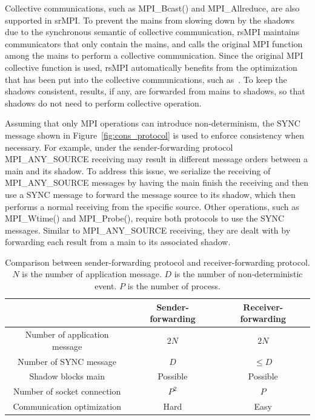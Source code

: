 Collective communications, such as MPI\_Bcast() and MPI\_Allreduce, are also supported in srMPI. To prevent the mains from slowing down by the shadows due to the synchronous semantic of collective communication, rsMPI maintains communicators that only contain the mains, and calls the original MPI function among the mains to perform a collective communication. Since the original MPI collective function is used, rsMPI automatically benefits from the optimization that has been put into the collective communications, such as~\cite{thakur2005optimization}. To keep the shadows consistent, results, if any, are forwarded from mains to shadows, so that shadows do not need to perform collective operation.

Assuming that only MPI operations can introduce non-determinism, the SYNC message shown in Figure~\ref{fig:cons_protocol} is used to enforce consistency when necessary. For example, under the sender-forwarding protocol MPI\_ANY\_SOURCE receiving may result in different message orders between a main and its shadow. To address this issue, we serialize the receiving of MPI\_ANY\_SOURCE messages by having the main finish the receiving and then use a SYNC message to forward the message source to its shadow, which then performs a normal receiving from the specific source. Other operations, such as MPI\_Wtime() and MPI\_Probe(), require both protocols to use the SYNC messages. Similar to MPI\_ANY\_SOURCE receiving, they are dealt with by forwarding each result from a main to its associated shadow.

\begin{table}[!h]
\caption{Comparison between sender-forwarding protocol and receiver-forwarding protocol. $N$ is the number of application message. $D$ is the number of non-deterministic event. $P$ is the number of process.}
\centering
\begin{tabular}{|c | c | c |}
\hline 
 & Sender-forwarding  & Receiver-forwarding  \\
\hline \hline 
Number of application message  & $2N$ & $2N$ \\
\hline
Number of SYNC message & $D$ &  $\le D$ \\
\hline
Shadow blocks main & Possible & Possible \\
\hline
Number of socket connection & $P^2$ & $P$ \\
\hline
Communication optimization & Hard & Easy \\
\hline
\end{tabular}
\label{tbl:cons_protocol_comp}
\end{table}

